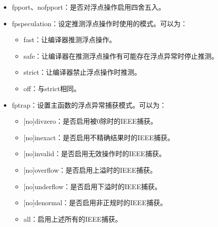 \documentclass[a4paper,12pt,english]{sphinxmanual}
\begin{document}
\begin{itemize}
\begin{itemize}
\end{itemize}

\item {} 
\sphinxAtStartPar
\sphinxhyphen{}fp\sphinxhyphen{}port、\sphinxhyphen{}no\sphinxhyphen{}fp\sphinxhyphen{}port：是否对浮点操作启用四舍五入。

\item {} 
\sphinxAtStartPar
\sphinxhyphen{}fp\sphinxhyphen{}speculation：设定推测浮点操作时使用的模式。可以为：
\begin{itemize}
\item {} 
\sphinxAtStartPar
fast：让编译器推测浮点操作。

\item {} 
\sphinxAtStartPar
safe：让编译器在推测浮点操作有可能存在浮点异常时停止推测。

\item {} 
\sphinxAtStartPar
strict：让编译器禁止浮点操作时推测。

\item {} 
\sphinxAtStartPar
off：与strict相同。

\end{itemize}

\item {} 
\sphinxAtStartPar
\sphinxhyphen{}fp\sphinxhyphen{}trap：设置主函数的浮点异常捕获模式。可以为：
\begin{itemize}
\item {} 
\sphinxAtStartPar
{[}no{]}divzero：是否启用被0除时的IEEE捕获。

\item {} 
\sphinxAtStartPar
{[}no{]}inexact：是否启用不精确结果时的IEEE捕获。

\item {} 
\sphinxAtStartPar
{[}no{]}invalid：是否启用无效操作时的IEEE捕获。

\item {} 
\sphinxAtStartPar
{[}no{]}overflow：是否启用上溢时的IEEE捕获。

\item {} 
\sphinxAtStartPar
{[}no{]}underflow：是否启用下溢时的IEEE捕获。

\item {} 
\sphinxAtStartPar
{[}no{]}denormal：是否启用非正规时的IEEE捕获。

\item {} 
\sphinxAtStartPar
all：启用上述所有的IEEE捕获。


\end{itemize}
\end{itemize}
\end{document}
